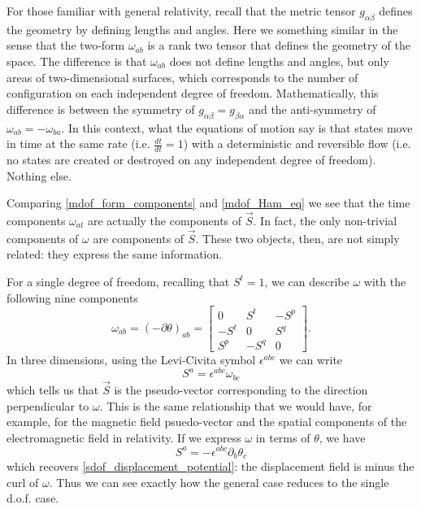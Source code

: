 \documentclass[10pt,twocolumn, nofootinbib]{revtex4-2}
\begin{document}
For those familiar with general relativity, recall that the metric tensor $g_{\alpha\beta}$ defines the geometry by defining lengths and angles. Here we something similar in the sense that the two-form $\omega_{ab}$ is a rank two tensor that defines the geometry of the space. The difference is that $\omega_{ab}$ does not define lengths and angles, but only areas of two-dimensional surfaces, which corresponds to the number of configuration on each independent degree of freedom. Mathematically, this difference is between the symmetry of $g_{\alpha\beta} = g_{\beta\alpha}$ and the anti-symmetry of $\omega_{ab} = -\omega_{ba}$. In this context, what the equations of motion say is that states move in time at the same rate (i.e. $\frac{dt}{dt} = 1$) with a deterministic and reversible flow (i.e. no states are created or destroyed on any independent degree of freedom). Nothing else.

Comparing \ref{mdof_form_components} and \ref{mdof_Ham_eq} we see that the time components $\omega_{at}$ are actually the components of $\vec{S}$. In fact, the only non-trivial components of $\omega$ are components of $\vec{S}$. These two objects, then, are not simply related: they express the same information.

For a single degree of freedom, recalling that $S^t = 1$, we can describe $\omega$ with the following nine components
\begin{equation}\label{mdof_reduceto_sdof}
	\omega_{ab}=(-\partial\theta)_{ab} = \begin{bmatrix}
		0 & S^t & -S^p \\
		-S^t & 0 & S^q \\
		S^p & - S^q & 0
	\end{bmatrix}.
\end{equation}
In three dimensions, using the Levi-Civita symbol $\epsilon^{abc}$ we can write
\begin{equation}
	S^a = \epsilon^{abc} \omega_{bc}
\end{equation}
which tells us that $\vec{S}$ is the pseudo-vector corresponding to the direction perpendicular to $\omega$. This is the same relationship that we would have, for example, for the magnetic field psuedo-vector and the spatial components of the electromagnetic field in relativity. If we express $\omega$ in terms of $\theta$, we have
\begin{equation}
	S^a = - \epsilon^{abc} \partial_b \theta_c
\end{equation}
which recovers \ref{sdof_displacement_potential}: the displacement field is minus the curl of $\omega$. Thus we can see exactly how the general case reduces to the single d.o.f. case.
\end{document}

